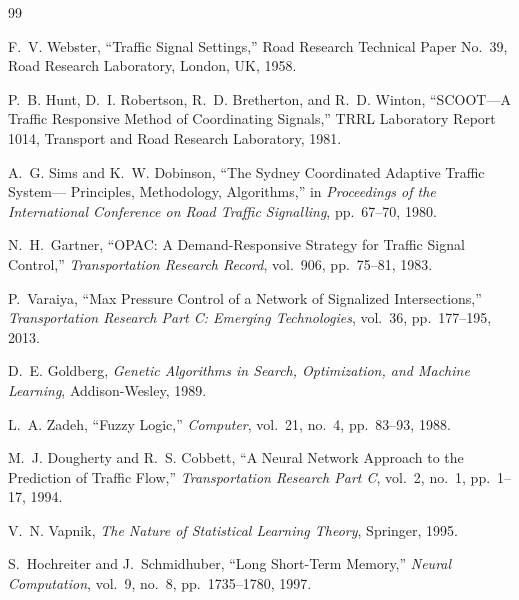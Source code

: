 \documentclass[3p,times]{elsarticle}
\theoremstyle{plain}
\theoremstyle{definition}
\begin{document}
\begin{thebibliography}{99}


F.~V. Webster,
``Traffic Signal Settings,''
Road Research Technical Paper No.~39,
Road Research Laboratory, London, UK, 1958.

P.~B. Hunt, D.~I. Robertson, R.~D. Bretherton, and R.~D. Winton,
``SCOOT---A Traffic Responsive Method of Coordinating Signals,''
TRRL Laboratory Report 1014,
Transport and Road Research Laboratory, 1981.

A.~G. Sims and K.~W. Dobinson,
``The Sydney Coordinated Adaptive Traffic System---
Principles, Methodology, Algorithms,''
in \textit{Proceedings of the International Conference on Road
Traffic Signalling}, pp.~67--70, 1980.

N.~H.~Gartner,
``OPAC: A Demand-Responsive Strategy for Traffic Signal Control,''
\textit{Transportation Research Record},
vol.~906, pp.~75--81, 1983.

P.~Varaiya,
``Max Pressure Control of a Network of Signalized Intersections,''
\textit{Transportation Research Part C: Emerging Technologies},
vol.~36, pp.~177--195, 2013.


D.~E. Goldberg,
\textit{Genetic Algorithms in Search, Optimization, and Machine
Learning},
Addison-Wesley, 1989.

L.~A. Zadeh,
``Fuzzy Logic,''
\textit{Computer},
vol.~21, no.~4, pp.~83--93, 1988.

M.~J. Dougherty and R.~S. Cobbett,
``A Neural Network Approach to the Prediction of Traffic Flow,''
\textit{Transportation Research Part C},
vol.~2, no.~1, pp.~1--17, 1994.

V.~N. Vapnik,
\textit{The Nature of Statistical Learning Theory},
Springer, 1995.

S.~Hochreiter and J.~Schmidhuber,
``Long Short-Term Memory,''
\textit{Neural Computation},
vol.~9, no.~8, pp.~1735--1780, 1997.



\end{thebibliography}
\end{document}
